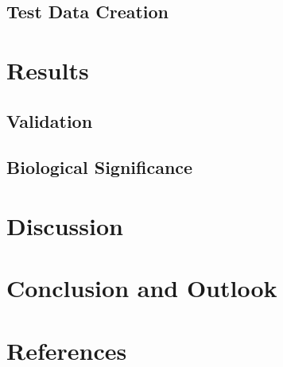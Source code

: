 \documentclass{article}
\begin{document}
\subsection{Test Data Creation}
\section{Results}\label{sec: Results}
\subsection{Validation}
\subsection{Biological Significance}
\section{Discussion}
\section{Conclusion and Outlook}

\section{References}
%


\end{document}
